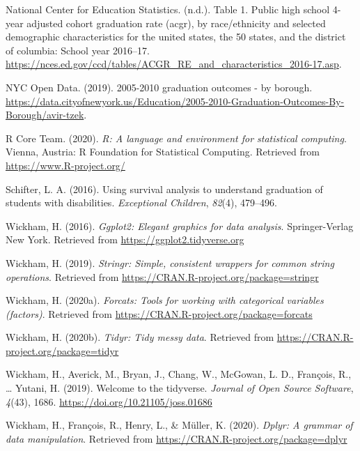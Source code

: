 \documentclass[
  english,
  man, fleqn, noextraspace]{apa6}
\begin{document}
\leavevmode\hypertarget{ref-Table1Pu71:online}{}%
National Center for Education Statistics. (n.d.). Table 1. Public high school 4-year adjusted cohort graduation rate (acgr), by race/ethnicity and selected demographic characteristics for the united states, the 50 states, and the district of columbia: School year 2016--17. \url{https://nces.ed.gov/ccd/tables/ACGR_RE_and_characteristics_2016-17.asp}.

\leavevmode\hypertarget{ref-2005201053:online}{}%
NYC Open Data. (2019). 2005-2010 graduation outcomes - by borough. \url{https://data.cityofnewyork.us/Education/2005-2010-Graduation-Outcomes-By-Borough/avir-tzek}.

\leavevmode\hypertarget{ref-R-base}{}%
R Core Team. (2020). \emph{R: A language and environment for statistical computing}. Vienna, Austria: R Foundation for Statistical Computing. Retrieved from \url{https://www.R-project.org/}

\leavevmode\hypertarget{ref-schifter2016using}{}%
Schifter, L. A. (2016). Using survival analysis to understand graduation of students with disabilities. \emph{Exceptional Children}, \emph{82}(4), 479--496.

\leavevmode\hypertarget{ref-R-ggplot2}{}%
Wickham, H. (2016). \emph{Ggplot2: Elegant graphics for data analysis}. Springer-Verlag New York. Retrieved from \url{https://ggplot2.tidyverse.org}

\leavevmode\hypertarget{ref-R-stringr}{}%
Wickham, H. (2019). \emph{Stringr: Simple, consistent wrappers for common string operations}. Retrieved from \url{https://CRAN.R-project.org/package=stringr}

\leavevmode\hypertarget{ref-R-forcats}{}%
Wickham, H. (2020a). \emph{Forcats: Tools for working with categorical variables (factors)}. Retrieved from \url{https://CRAN.R-project.org/package=forcats}

\leavevmode\hypertarget{ref-R-tidyr}{}%
Wickham, H. (2020b). \emph{Tidyr: Tidy messy data}. Retrieved from \url{https://CRAN.R-project.org/package=tidyr}

\leavevmode\hypertarget{ref-R-tidyverse}{}%
Wickham, H., Averick, M., Bryan, J., Chang, W., McGowan, L. D., François, R., \ldots{} Yutani, H. (2019). Welcome to the tidyverse. \emph{Journal of Open Source Software}, \emph{4}(43), 1686. \url{https://doi.org/10.21105/joss.01686}

\leavevmode\hypertarget{ref-R-dplyr}{}%
Wickham, H., François, R., Henry, L., \& Müller, K. (2020). \emph{Dplyr: A grammar of data manipulation}. Retrieved from \url{https://CRAN.R-project.org/package=dplyr}
\end{document}
